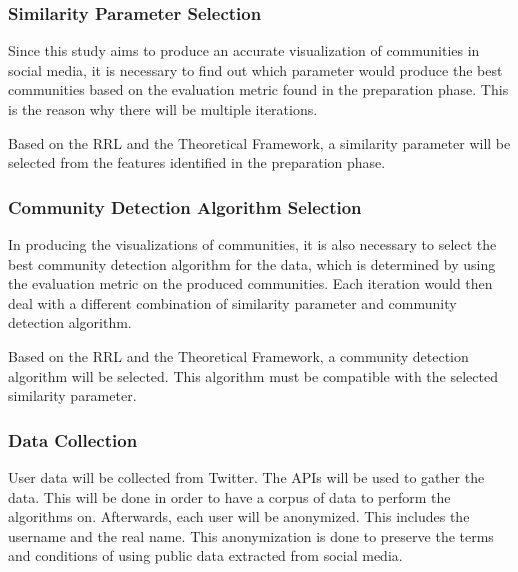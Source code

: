 \subsubsection{Similarity Parameter Selection}




Since this study aims to produce an accurate visualization of communities in social media, it is necessary to find out which parameter would produce the best communities based on the evaluation metric found in the preparation phase. This is the reason why there will be multiple iterations. 




Based on the RRL and the Theoretical Framework, a similarity parameter will be selected from the features identified in the preparation phase.




\subsubsection{Community Detection Algorithm Selection}




In producing the visualizations of communities, it is also necessary to select the best community detection algorithm for the data, which is determined by using the evaluation metric on the produced communities. Each iteration would then deal with a different combination of similarity parameter and community detection algorithm.




Based on the RRL and the Theoretical Framework, a community detection algorithm will be selected. This algorithm must be compatible with the selected similarity parameter.




\subsubsection{Data Collection}




User data will be collected from Twitter. The API\vtick s will be used to gather the data. This will be done in order to have a corpus of data to perform the algorithms on. Afterwards, each user will be anonymized. This includes the username and the real name.  This anonymization is done to preserve the terms and conditions of using public data extracted from social media. 




